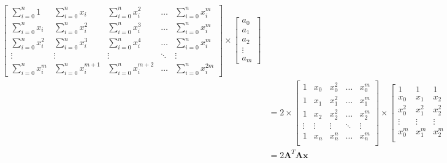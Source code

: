 \documentclass{article}
\newcommand{\x}{\mathbf{x}}
\newcommand{\A}{\mathbf{A}}
\begin{document}
\begin{equation}
\begin{split}
\begin{bmatrix}
        \sum_{i=0}^{n} 1 & \sum_{i=0}^{n} x_i & \sum_{i=0}^{n} x_i ^2 & \ldots & \sum_{i=0}^{n} x_i ^m\\
        \sum_{i=0}^{n} x_i & \sum_{i=0}^{n} x_i ^2 & \sum_{i=0}^{n} x_i ^3 & \ldots & \sum_{i=0}^{n} x_i ^m\\
        \sum_{i=0}^{n} x_i ^2 & \sum_{i=0}^{n} x_i ^3 & \sum_{i=0}^{n} x_i ^4 & \ldots & \sum_{i=0}^{n} x_i ^m\\
        \vdots & \vdots & \vdots & \ddots & \vdots \\
        \sum_{i=0}^{n} x_i ^{m} & \sum_{i=0}^{n} x_i ^{m+1} & \sum_{i=0}^{n} x_i ^{m+2} & \ldots & \sum_{i=0}^{n} x_i ^{2m}
    \end{bmatrix}
    \times
    \begin{bmatrix}
        a_0 \\
        a_1 \\
        a_2 \\
        \vdots \\
        a_m
    \end{bmatrix}\\
    & = 2 \times
    \begin{bmatrix}
        1 & x_0 & x_0 ^2 & \ldots & x_0^m \\
        1 & x_1 & x_1 ^2 & \ldots & x_1^m \\
        1 & x_2 & x_2 ^2 & \ldots & x_2^m \\
        \vdots & \vdots & \vdots & \ddots & \vdots \\
        1 & x_n & x_n ^n & \ldots & x_n^m \\
    \end{bmatrix}
    \times
    \begin{bmatrix}
        1 & 1 & 1 & \ldots & 1 \\
        x_0 & x_1 & x_2 & \ldots & x_n \\
        x_0^2 & x_1^2 & x_2 ^2 & \ldots & x_n^2 \\
        \vdots & \vdots & \vdots & \ddots & \vdots \\
        x_0^m & x_1^m & x_2 ^m & \ldots & x_n^m \\
    \end{bmatrix}
    \times
    \begin{bmatrix}
        a_0 \\
        a_1 \\
        a_2 \\
        \vdots \\
        a_m
    \end{bmatrix}\\
    &= 2\A ^T \A \x
\end{split}
\end{equation}
\end{document}

